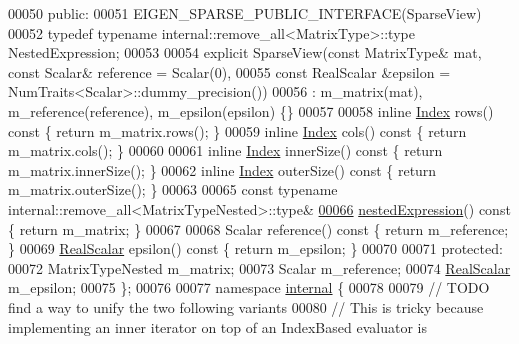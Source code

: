 \begin{DoxyCode}
00050 \textcolor{keyword}{public}:
00051   EIGEN\_SPARSE\_PUBLIC\_INTERFACE(SparseView)
00052   \textcolor{keyword}{typedef} \textcolor{keyword}{typename} internal::remove\_all<MatrixType>::type NestedExpression;
00053 
00054   \textcolor{keyword}{explicit} SparseView(\textcolor{keyword}{const} MatrixType& mat, \textcolor{keyword}{const} Scalar& reference = Scalar(0),
00055                       \textcolor{keyword}{const} RealScalar &epsilon = NumTraits<Scalar>::dummy\_precision())
00056     : m\_matrix(mat), m\_reference(reference), m\_epsilon(epsilon) \{\}
00057 
00058   \textcolor{keyword}{inline} \hyperlink{namespace_eigen_a62e77e0933482dafde8fe197d9a2cfde}{Index} rows()\textcolor{keyword}{ const }\{ \textcolor{keywordflow}{return} m\_matrix.rows(); \}
00059   \textcolor{keyword}{inline} \hyperlink{namespace_eigen_a62e77e0933482dafde8fe197d9a2cfde}{Index} cols()\textcolor{keyword}{ const }\{ \textcolor{keywordflow}{return} m\_matrix.cols(); \}
00060 
00061   \textcolor{keyword}{inline} \hyperlink{namespace_eigen_a62e77e0933482dafde8fe197d9a2cfde}{Index} innerSize()\textcolor{keyword}{ const }\{ \textcolor{keywordflow}{return} m\_matrix.innerSize(); \}
00062   \textcolor{keyword}{inline} \hyperlink{namespace_eigen_a62e77e0933482dafde8fe197d9a2cfde}{Index} outerSize()\textcolor{keyword}{ const }\{ \textcolor{keywordflow}{return} m\_matrix.outerSize(); \}
00063   
00065   \textcolor{keyword}{const} \textcolor{keyword}{typename} internal::remove\_all<MatrixTypeNested>::type&
\hyperlink{group___sparse_core___module_a50f53a9405017012077ae907959aca14}{00066}   \hyperlink{group___sparse_core___module_a50f53a9405017012077ae907959aca14}{nestedExpression}()\textcolor{keyword}{ const }\{ \textcolor{keywordflow}{return} m\_matrix; \}
00067   
00068   Scalar reference()\textcolor{keyword}{ const }\{ \textcolor{keywordflow}{return} m\_reference; \}
00069   \hyperlink{group___sparse_core___module_aaec8ace6efb785c81d442931c3248d88}{RealScalar} epsilon()\textcolor{keyword}{ const }\{ \textcolor{keywordflow}{return} m\_epsilon; \}
00070   
00071 \textcolor{keyword}{protected}:
00072   MatrixTypeNested m\_matrix;
00073   Scalar m\_reference;
00074   \hyperlink{group___sparse_core___module_aaec8ace6efb785c81d442931c3248d88}{RealScalar} m\_epsilon;
00075 \};
00076 
00077 \textcolor{keyword}{namespace }\hyperlink{namespaceinternal}{internal} \{
00078 
00079 \textcolor{comment}{// TODO find a way to unify the two following variants}
00080 \textcolor{comment}{// This is tricky because implementing an inner iterator on top of an IndexBased evaluator is}

\end{DoxyCode}
